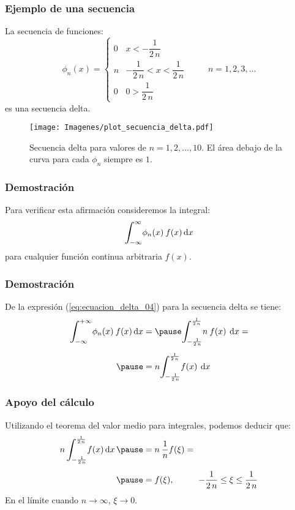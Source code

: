 \documentclass[12pt]{beamer}
\begin{document}
\begin{frame}
\frametitle{Ejemplo de una secuencia}
La secuencia de funciones:
\pause
\begin{equation}
\phi_{n} (x) = \begin{cases}
0 & x < - \dfrac{1}{2 \, n} \\
n & - \dfrac{1}{2 \, n} < x < \dfrac{1}{2 \, n} \\
0 & 0 >  \dfrac{1}{2 \, n}
\end{cases}
\hspace{1cm} n = 1, 2, 3, \ldots
\label{eq:ecuacion_delta_04}
\end{equation}
es una secuencia delta.
\end{frame}
\begin{frame}[plain]
\begin{figure}[H]
    \centering
    \texttt{[image: Imagenes/plot\_secuencia\_delta.pdf]}
    \caption{Secuencia delta para valores de $n = 1, 2, \ldots, 10$. El área debajo de la curva para cada $\phi_{n}$ siempre es $1$.}
    \label{fig:secuncia_delta_01}
\end{figure}
\end{frame}
\begin{frame}
\frametitle{Demostración}
Para verificar esta afirmación consideremos la integral:
\pause
\begin{align*}
\scaleint{6ex}_{\bs -\infty}^{\infty} \phi_{n} (x) \: f (x) \dd{x}
\end{align*}
para cualquier función continua arbitraria $f (x)$.
\end{frame}
\begin{frame}
\frametitle{Demostración}
De la expresión (\ref{eq:ecuacion_delta_04}) para la secuencia delta se tiene:
\pause
\begin{eqnarray*}
\scaleint{6ex}_{\bs -\infty}^{+ \infty} \phi_{n} (x) \: f (x) \dd{x} &=  \pause \scaleint{6ex}_{\bs -\frac{1}{2 \, n}}^{\frac{1}{2 \, n}} n \: f (x) \: \dd{x} = \\[0.5em] \pause
&= n \scaleint{6ex}_{\bs -\frac{1}{2 \, n}}^{\frac{1}{2 \, n}} f (x) \:  \dd{x}
\end{eqnarray*}
\end{frame}
\begin{frame}
\frametitle{Apoyo del cálculo}
Utilizando el teorema del valor medio para integrales, podemos deducir que:
\pause
\begin{eqnarray*}
\begin{aligned}
n \, \scaleint{6ex}_{\bs -\frac{1}{2 \, n}}^{\frac{1}{2 \, n}} f (x) \dd{x} \pause &= n \: \dfrac{1}{n} f (\xi) = \\[0.5em] \pause
&= f (\xi), \hspace{1cm} - \dfrac{1}{2 \, n} \leq \xi \leq \dfrac{1}{2 \, n}
\end{aligned}
\end{eqnarray*}
En el límite cuando $n \to \infty$, $\xi \to 0$.
\end{frame}
\end{document}
